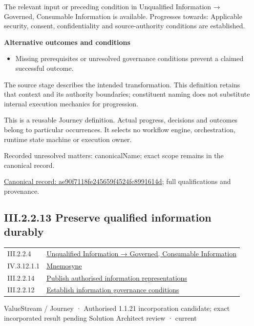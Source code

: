 The relevant input or preceding condition in Unqualified Information → Governed, Consumable Information is available. Progresses towards: Applicable security, consent, confidentiality and source-authority conditions are established.



\par\medskip\textbf{Alternative outcomes and conditions}\par


\begin{itemize}


\item Missing prerequisites or unresolved governance conditions prevent a claimed successful outcome.

\end{itemize}


The source stage describes the intended transformation. This definition retains that context and its authority boundaries; constituent naming does not substitute internal execution mechanics for progression.



This is a reusable Journey definition. Actual progress, decisions and outcomes belong to particular occurrences. It selects no workflow engine, orchestration, runtime state machine or execution owner.


{\small Recorded unresolved matters: canonicalName; exact scope remains in the canonical record.}\par
{\footnotesize \href{../../../../../../../continuum/strategy/value-stream/ae90f7118fe245659f4524fc8991614d.md}{Canonical record: ae90f7118fe245659f4524fc8991614d}; full qualifications and provenance.}\par
\subsection*{III.2.2.13 Preserve qualified information durably}
\label{navigation:III.2.2.13}

\begin{longtable}{p{.22\linewidth}p{.73\linewidth}}
III.2.2.4 & \hyperref[element:02e036f18bab400bac261007e39457ee]{Unqualified Information → Governed, Consumable Information} \\
IV.3.12.1.1 & \hyperref[element:7985e647bf9e4ca3ba70faf9e3e4ae02]{Mnemosyne} \\
III.2.2.14 & \hyperref[element:91da459e860e4f359e440a65f0c94bcb]{Publish authorised information representations} \\
III.2.2.12 & \hyperref[element:ae90f7118fe245659f4524fc8991614d]{Establish information governance conditions} \\
\end{longtable}
\label{element:e07ef0bcd9444af3a22ab45bbb3afc38}
{\small ValueStream / Journey · Authorised 1.1.21 incorporation candidate; exact incorporated result pending Solution Architect review · current}\par

